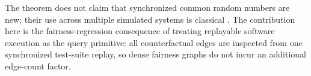 The theorem does not claim that synchronized common random numbers are new;
their use across multiple simulated systems is classical
\cite{YangNelson1991,NelsonMatejcik1995}.  The contribution here is the
fairness-regression consequence of treating replayable software execution as the
query primitive: all counterfactual edges are inspected from one synchronized
test-suite replay, so dense fairness graphs do not incur an additional
edge-count factor.
